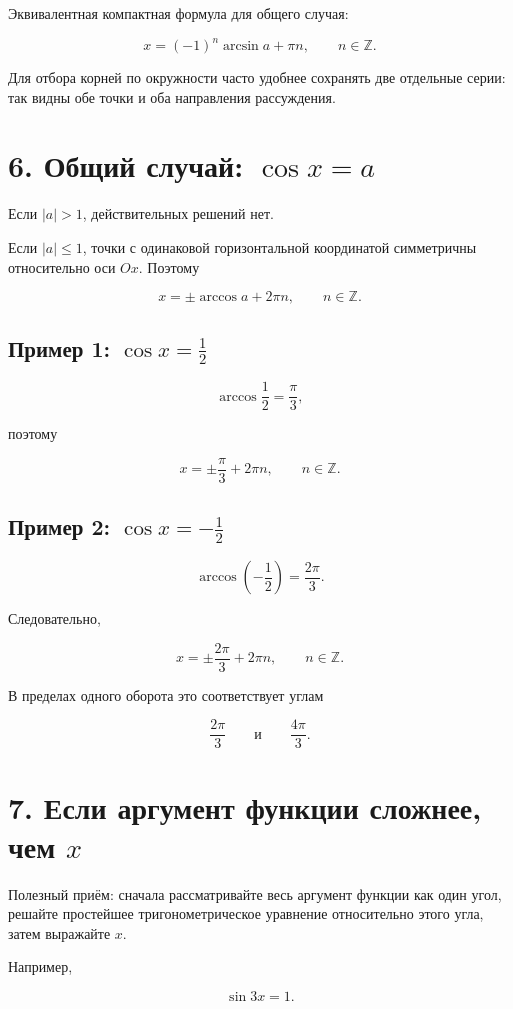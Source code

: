 \documentclass[a4paper,12pt]{article}
\newcommand{\Z}{\mathbb{Z}}
\begin{document}
Эквивалентная компактная формула для общего случая:

\[
\boxed{x=(-1)^n\arcsin a+\pi n,
\qquad n\in\Z.}
\]

Для отбора корней по окружности часто удобнее сохранять две отдельные серии: так видны обе точки и оба направления рассуждения.

\section{6. Общий случай: \(\cos x=a\)}

Если \(|a|>1\), действительных решений нет.

Если \(|a|\le1\), точки с одинаковой горизонтальной координатой симметричны относительно оси \(Ox\). Поэтому

\[
\boxed{x=\pm\arccos a+2\pi n,
\qquad n\in\Z.}
\]

\subsection{Пример 1: \(\cos x=\frac12\)}

\[
\arccos\frac12=\frac{\pi}{3},
\]

поэтому

\[
\boxed{x=\pm\frac{\pi}{3}+2\pi n,
\qquad n\in\Z.}
\]

\subsection{Пример 2: \(\cos x=-\frac12\)}

\[
\arccos\left(-\frac12\right)=\frac{2\pi}{3}.
\]

Следовательно,

\[
\boxed{x=\pm\frac{2\pi}{3}+2\pi n,
\qquad n\in\Z.}
\]

В пределах одного оборота это соответствует углам

\[
\frac{2\pi}{3}
\qquad\text{и}\qquad
\frac{4\pi}{3}.
\]

\section{7. Если аргумент функции сложнее, чем \(x\)}

Полезный приём: сначала рассматривайте весь аргумент функции как один угол, решайте простейшее тригонометрическое уравнение относительно этого угла, затем выражайте \(x\).

Например,

\[
\sin3x=1.
\]
\end{document}
